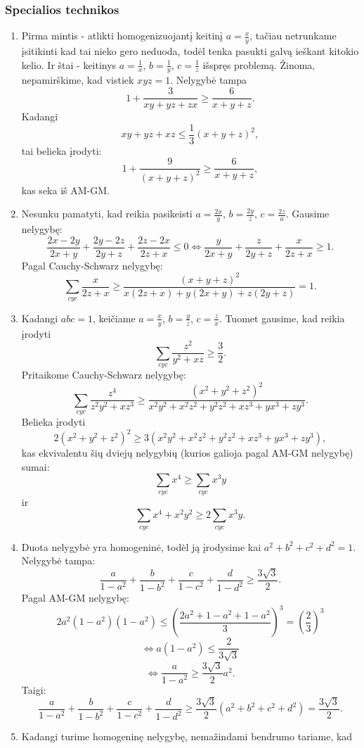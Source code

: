 \subsubsection*{Specialios technikos}
\begin{enumerate}
\item
    Pirma mintis - atlikti homogenizuojantį keitinį $a=\frac{x}{y}$,
    tačiau netrunkame įsitikinti kad tai nieko gero neduoda, todėl
    tenka pasukti galvą ieškant kitokio kelio. Ir štai - keitinys
    $a=\frac{1}{x}$, $b=\frac{1}{y}$, $c=\frac{1}{z}$ išspręs problemą.
    Žinoma, nepamirškime, kad vistiek $xyz=1$. Nelygybė tampa
    $$1+\frac{3}{xy+yz+zx}\geq\frac{6}{x+y+z}.$$ Kadangi
    $$xy+yz+xz\leq\frac{1}{3}(x+y+z)^2,$$ tai belieka įrodyti:
    $$1+\frac{9}{(x+y+z)^2}\geq\frac{6}{x+y+z},$$ kas seka iš AM-GM.
\item
    Nesunku pamatyti, kad reikia pasikeisti $a=\frac{2x}{y}$,
    $b=\frac{2y}{z}$, $c=\frac{2z}{a}$. Gausime nelygybę:
    $$\frac{2x-2y}{2x+y}+\frac{2y-2z}{2y+z}+\frac{2z-2x}{2z+x}\leq0\Leftrightarrow\frac{y}{2x+y}+\frac{z}{2y+z}+\frac{x}{2z+x}\geq1.$$
    Pagal Cauchy-Schwarz nelygybę:
    $$\sum_{cyc}{\frac{x}{2z+x}}\geq\frac{(x+y+z)^2}{x(2z+x)+y(2x+y)+z(2y+z)}=1.$$
\item
    Kadangi $abc=1$, keičiame $a=\frac{x}{y}$, $b=\frac{y}{z}$,
    $c=\frac{z}{x}$. Tuomet gausime, kad reikia įrodyti
    $$\sum_{cyc}{\frac{z^2}{y^2+xz}}\geq\frac{3}{2}.$$ Pritaikome
    Cauchy-Schwarz nelygybę:
    $$\sum_{cyc}{\frac{z^4}{z^2y^2+xz^3}}\geq\frac{(x^2+y^2+z^2)^2}{x^2y^2+x^2z^2+y^2z^2+xz^3+yx^3+zy^3}.$$
    Belieka įrodyti
    $$2(x^2+y^2+z^2)^2\geq3(x^2y^2+x^2z^2+y^2z^2+xz^3+yx^3+zy^3),$$
    kas ekvivalentu šių dviejų nelygybių (kurios galioja pagal AM-GM
    nelygybę) sumai: $$\sum_{cyc}{x^4}\geq\sum_{cyc}{x^3y}$$ ir
    $$\sum_{cyc}{x^4+x^2y^2}\geq2\sum_{cyc}{x^3y}.$$
\item
     Duota nelygybė yra homogeninė, todėl ją įrodysime kai
     $a^2+b^2+c^2+d^2=1$. Nelygybė tampa:
     $$\frac{a}{1-a^2}+\frac{b}{1-b^2}+\frac{c}{1-c^2}+\frac{d}{1-d^2}\geq\frac{3\sqrt{3}}{2}.$$
     Pagal AM-GM nelygybę:
     $$2a^2(1-a^2)(1-a^2)\leq\left(\frac{2a^2+1-a^2+1-a^2}{3}\right)^3=\left(\frac{2}{3}\right)^3$$
     $$\Leftrightarrow a(1-a^2)\leq\frac{2}{3\sqrt{3}}$$
     $$\Leftrightarrow\frac{a}{1-a^2}\geq\frac{3\sqrt{3}}{2}a^2.$$ Taigi:
     $$\frac{a}{1-a^2}+\frac{b}{1-b^2}+\frac{c}{1-c^2}+\frac{d}{1-d^2}\geq\frac{3\sqrt{3}}{2}(a^2+b^2+c^2+d^2)=\frac{3\sqrt{3}}{2}.$$
\item
    Kadangi turime homogeninę nelygybę, nemažindami bendrumo tariame, kad

\end{enumerate}
